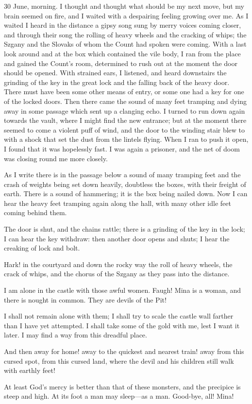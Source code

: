 \begin{diary}{30 June, morning.}
I thought and thought what should be my next move, but my brain seemed on fire, and I waited with a despairing feeling growing over me. As I waited I heard in the distance a gipsy song sung by merry voices coming closer, and through their song the rolling of heavy wheels and the cracking of whips; the Szgany and the Slovaks of whom the Count had spoken were coming. With a last look around and at the box which contained the vile body, I ran from the place and gained the Count's room, determined to rush out at the moment the door should be opened. With strained ears, I listened, and heard downstairs the grinding of the key in the great lock and the falling back of the heavy door. There must have been some other means of entry, or some one had a key for one of the locked doors. Then there came the sound of many feet tramping and dying away in some passage which sent up a clanging echo. I turned to run down again towards the vault, where I might find the new entrance; but at the moment there seemed to come a violent puff of wind, and the door to the winding stair blew to with a shock that set the dust from the lintels flying. When I ran to push it open, I found that it was hopelessly fast. I was again a prisoner, and the net of doom was closing round me more closely.

As I write there is in the passage below a sound of many tramping feet and the crash of weights being set down heavily, doubtless the boxes, with their freight of earth. There is a sound of hammering; it is the box being nailed down. Now I can hear the heavy feet tramping again along the hall, with many other idle feet coming behind them.

The door is shut, and the chains rattle; there is a grinding of the key in the lock; I can hear the key withdraw: then another door opens and shuts; I hear the creaking of lock and bolt.

Hark! in the courtyard and down the rocky way the roll of heavy wheels, the crack of whips, and the chorus of the Szgany as they pass into the distance.

I am alone in the castle with those awful women. Faugh! Mina is a woman, and there is nought in common. They are devils of the Pit!

I shall not remain alone with them; I shall try to scale the castle wall farther than I have yet attempted. I shall take some of the gold with me, lest I want it later. I may find a way from this dreadful place.

And then away for home! away to the quickest and nearest train! away from this cursed spot, from this cursed land, where the devil and his children still walk with earthly feet!

At least God's mercy is better than that of these monsters, and the precipice is steep and high. At its foot a man may sleep—as a man. Good-bye, all! Mina!
\end{diary}
